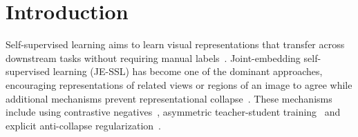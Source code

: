 \documentclass{article} %
\theoremstyle{remark}
\newcommand{\MF}[1]{\textcolor{darkgreen}{[MarcoF: #1]}}
\newcommand{\vale}[1]{\textcolor{pink}{[VM: #1]}}
\begin{document}




\section{Introduction}
\label{sec:intro}

Self-supervised learning aims to learn visual representations that transfer across downstream tasks without requiring manual labels~\citep{surveyjing2020self}. Joint-embedding self-supervised learning (JE-SSL) has become one of the dominant approaches, encouraging representations of related views or regions of an image to agree while additional mechanisms prevent representational collapse~\citep{jing2021directclr, vicreg2022}. These mechanisms include using contrastive negatives~\citep{simclr2020, mocohe2020momentum}, asymmetric teacher-student training~\citep{dinocaron2021, ibotzhou2022, byolgrill2020} and explicit anti-collapse regularization~\citep{lejepa2025, vicreg2022, visreg2026}.
\end{document}
